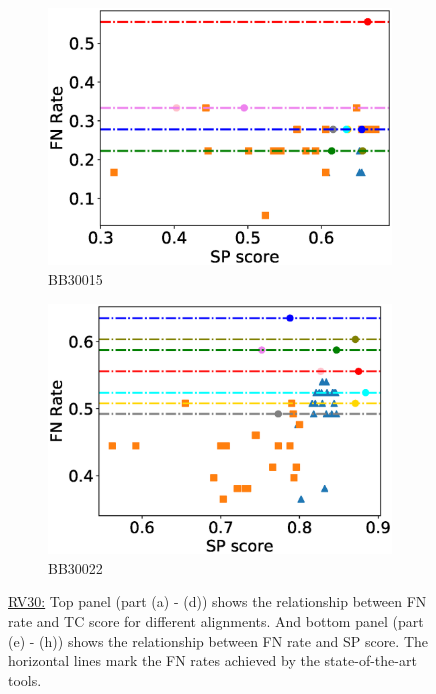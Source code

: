 \begin{figure}[!htbp]
\begin{adjustwidth}{-1cm}{-1cm}
\begin{subfigure}{0.22\textwidth}
			\includegraphics[width=\columnwidth]{Figure/summary/precomputedInit/Balibase/BB30015_fnrate_vs_sp_2}
			\caption{BB30015}
		\end{subfigure}
		\begin{subfigure}{0.22\textwidth}
			\includegraphics[width=\columnwidth]{Figure/summary/precomputedInit/Balibase/BB30022_fnrate_vs_sp_2}
			\caption{BB30022}
		\end{subfigure}	
		\caption{\underline{RV30:} Top panel (part (a) - (d)) shows the relationship between FN rate and TC score for different alignments. And bottom panel (part (e) - (h)) shows the relationship between FN rate and SP score. The horizontal lines mark the FN rates achieved by the state-of-the-art tools.}
		\label{fig:rv30_fnrate_vs_tc}
	\end{adjustwidth}
\end{figure}
